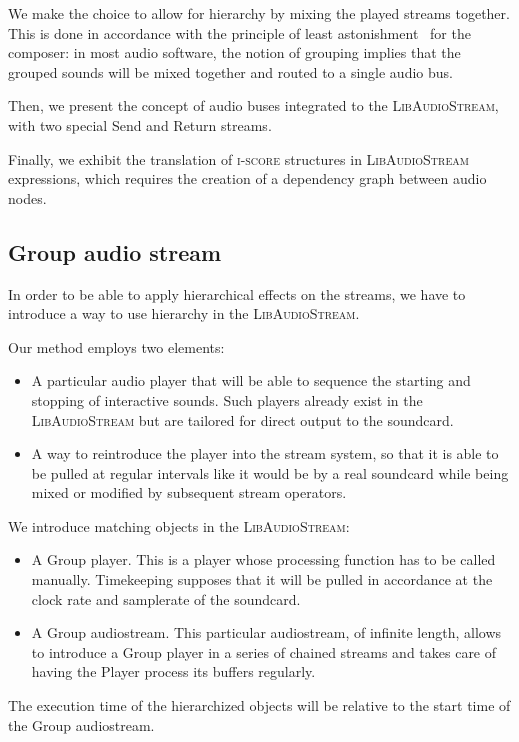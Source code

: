 \documentclass{article}
\newcommand*{\LibAudioStream}{\textsc{LibAudioStream}\xspace}
\newcommand*{\iscore}{\textsc{i-score}\xspace}
\begin{document}
We make the choice to allow for hierarchy by mixing the played streams together.
This is done in accordance with the principle of least astonishment~\cite{seebach2001cranky} for the composer: 
in most audio software, the notion of grouping implies that the grouped sounds will be mixed 
together and routed to a single audio bus.

Then, we present the concept of audio buses integrated to the \LibAudioStream,
with two special Send and Return streams.

Finally, we exhibit the translation of \iscore structures in \LibAudioStream expressions, which requires the creation of a dependency graph between audio nodes.
\subsection{Group audio stream}
In order to be able to apply hierarchical effects on the streams, 
we have to introduce a way to use hierarchy in the \LibAudioStream.

Our method employs two elements: 
\begin{itemize}
	\item A particular audio player that will be able to sequence the starting and stopping 
	of interactive sounds.
	Such players already exist in the \LibAudioStream but are tailored for direct output to
	the soundcard.
	\item A way to reintroduce the player into the stream system, so that it 
	is able to be pulled at regular intervals like it would be by a real soundcard while being mixed or modified by subsequent stream operators.
\end{itemize}

We introduce matching objects in the \LibAudioStream: 
\begin{itemize}
	\item A Group player. This is a player whose processing function has to be called manually. 
	Timekeeping supposes that it will be pulled in accordance at the clock rate
	and samplerate of the soundcard.
	\item A Group audiostream. This particular audiostream, of infinite length, 
	allows to introduce a Group player in a series of chained streams and takes care of having the Player process its buffers
    regularly.
\end{itemize}

The execution time of the hierarchized objects will be relative to the start time of the Group audiostream.
\end{document}
